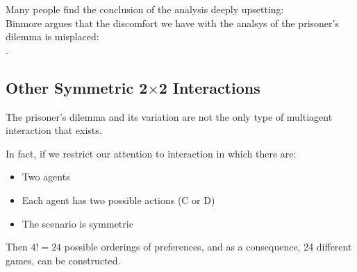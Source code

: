 	Many people find the conclusion of the analysis deeply upsetting: \cite{mastxt}\\
	Binmore argues that the discomfort we have with the analsys of the prisoner’s dilemma is misplaced:\\
	.
	
\subsection{Other Symmetric 2$\times$2 Interactions}
The prisoner’s dilemma and its variation are not the only type of multiagent interaction that exists.
	
	In fact, if we restrict our attention to interaction in which there are:
	\begin{itemize}
	\item Two agents
	\item Each agent has two possible actions (C or D)
	\item The scenario is symmetric
	\end{itemize}
	Then $4! = 24$ possible orderings of preferences, and as a consequence, 24 different games, can be constructed.
	
